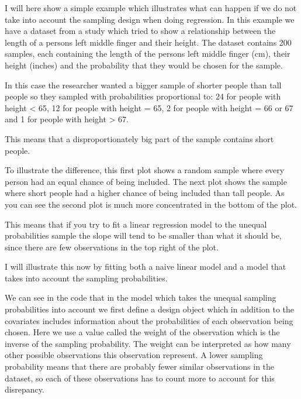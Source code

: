\documentclass{article}
\begin{document}
\begin{example}

I will here show a simple example which illustrates what can happen if we do not take into account the sampling design when doing regression. In this example we have a dataset from a study which tried to show a relationship between the length of a persons left middle finger and their height. The dataset contains 200 samples, each containing the length of the persons left middle finger (cm), their height (inches) and the probability that they would be chosen for the sample.

In this case the researcher wanted a bigger sample of shorter people than tall people so they sampled with probabilities proportional to: 24 for people with height < 65, 12 for people with height = 65, 2 for people with height = 66 or 67 and 1 for people with height > 67.


This means that a disproportionately big part of the sample contains short people. 

To illustrate the difference, this first plot shows a random sample where every person had an equal chance of being included. The next plot shows the sample where short people had a higher chance of being included than tall people. As you can see the second plot is much more concentrated in the bottom of the plot.



This means that if you try to fit a linear regression model to the unequal probabilities sample the slope will tend to be smaller than what it should be, since there are few observations in the top right of the plot.

I will illustrate this now by fitting both a naive linear model and a model that takes into account the sampling probabilities.



We can see in the code that in the model which takes the unequal sampling probabilities into account we first define a design object which in addition to the covariates includes information about the probabilities of each observation being chosen. Here we use a value called the weight of the observation which is the inverse of the sampling probability. The weight can be interpreted as how many other possible observations this observation represent. A lower sampling probability means that there are probably fewer similar observations in the dataset, so each of these observations has to count more to account for this disrepancy.


\end{example}
\end{document}
